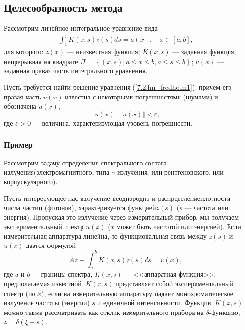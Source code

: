 \documentclass[12pt]{article}
\begin{document}
    \subsection*{Целесообразность метода}
    
    Рассмотрим линейное интегральное уравнение вида
    \begin{equation}
    	\begin{gathered}
    		\int_a^b K\left(x,s\right)z\left(s\right)ds=u\left(x\right), \quad x\in\left[a,b\right],
    	\end{gathered}
    	\label{7.2:fm_fredholm1}
    \end{equation}
    для которого: $z\left(x\right)$ --- неизвестная функция; $K\left(x,s\right)$ --- заданная функция, непрерывная на квадрате $\Pi =\left\{\left(x,s\right) |\, a \leqslant x \leqslant b, a\leqslant s\leqslant b\right\}$; $u\left(x\right)$ --- заданная правая часть интегрального уравнения.
    
    Пусть требуется найти решение уравнения (\ref{7.2:fm_fredholm1}), причем его правая часть $u\left(x\right)$ известна с некоторыми погрешностями (шумами) и обозначена $\tilde u\left(x\right)$,
    $$
    \Vert u\left(x\right) - \tilde u\left(x\right) \Vert < \varepsilon ,
    $$
    где $\varepsilon>0$ --- величина, характеризующая уровень погрешности.
	
	\subsubsection*{Пример}
	
	Рассмотрим задачу определения спектрального состава излучения\linebreak (электромагнитного, типа $\gamma$-излучения, или рентгеновского, или корпускулярного).
	
	Пусть интересующее нас излучение неоднородно и распределение\linebreak плотности числа частиц (фотонов), характеризуется функцией\linebreak $z\left(s\right)$ ($s$ --- частота или энергия).
	Пропуская это излучение через измерительный прибор, мы получаем экспериментальный спектр $u\left(x\right)$ ($x$ может быть частотой или энергией). Если измерительная аппаратура линейна, то функциональная связь между $z\left(s\right)$ и $u\left(x\right)$ дается формулой
	\begin{equation}
		Az\equiv \int_{a}^{b}K\left(x,s\right)z\left(s\right)ds=u\left(x\right),
		\label{7.2:fm_operator}
	\end{equation}
	где $a$ и $b$ --- границы спектра, $K\left(x,s\right)$ --- <<аппаратная функция>>, предполагаемая известной. $K\left(x,s\right)$ представляет собой экспериментальный спектр (по $x$), если на измерительную аппаратуру падает монохроматическое излучение частоты (энергии) $s$ и единичной интенсивности. Функцию $K\left(x,s\right)$ можно также рассматривать как отклик измерительного прибора на $\delta$-функцию, $z=\delta\left(\xi - s\right)$.
	
\end{document}
